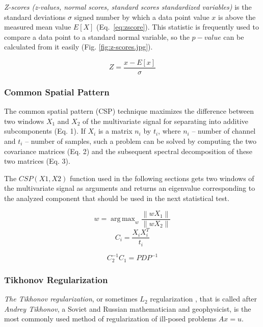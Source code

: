 \documentclass[14pt,a4paper]{scrartcl}
\DeclareMathOperator*{\argmax}{arg\,max}
\begin{document}
\textit{Z-scores (z-values, normal scores, standard scores standardized variables)} is the standard deviations $\sigma$ signed number by which a data point value $x$ is above the measured mean value $E[X]$ (Eq.~\ref{eq:zscore}). This statistic is frequently used to compare a data point to a standard normal variable, so the $p-value$ can be calculated from it easily (Fig. \ref{fig:z-scores.jpg}). 

\begin{equation} \label{eq:zscore}
Z = \frac{x - E[x]}{\sigma}
\end{equation}

\subsubsection{Common Spatial Pattern}
\label{sec:Methods:Data Analysis:Common Spatial Pattern}

The common spatial pattern (CSP) technique maximizes the difference between two windows $X_{1}$ and $X_{2}$ of the multivariate signal for separating into additive subcomponents (Eq. 1). If $X_{i}$ is a matrix $n_{i}$ by $t_{i}$, where $n_{i}$ – number of channel and $t_{i}$ – number of samples, such a problem can be solved by computing the two covariance matrices (Eq. 2) and the subsequent spectral decomposition of these two matrices (Eq. 3).

The $CSP(X1, X2)$ function used in the following sections gets two windows of the multivariate signal as arguments and returns an eigenvalue corresponding to the analyzed component that should be used in the next statistical test.

\begin{equation}
w = \argmax_{w}{\frac{\left \| wX_{1} \right \|}{\left \| wX_{2} \right \|}}
\end{equation}
\begin{equation}
C_{i} = \frac{X_{i}X^{T}_{i}}{t_{i}}
\end{equation}

\begin{equation}
C^{-1}_{2}C_{1} = PDP^{-1}
\end{equation}


\subsubsection{Tikhonov Regularization}
\label{sec:Methods:Data Analysis:Tikhonov Regularization}

\textit{The Tikhonov regularization}, or sometimes $L_2$ regularization \cite{Ng2004}, that is called after \textit{Andrey Tikhonov}, a Soviet and Russian mathematician and geophysicist, is the most commonly used method of regularization of ill-posed problems $Ax = u$. 
\end{document}
